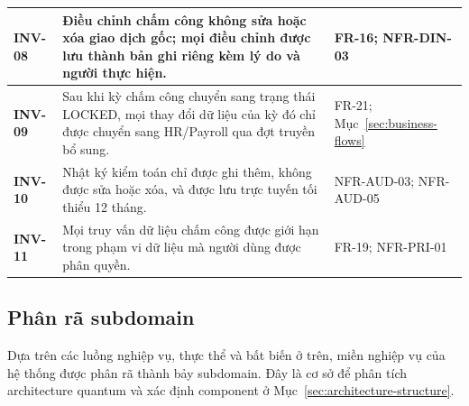 \begin{longtable}{|>{\centering\arraybackslash}m{1.4cm}|>{\raggedright\arraybackslash}m{10.4cm}|>{\raggedright\arraybackslash}m{3.6cm}|}
    \hline
    \textbf{INV-08} & Điều chỉnh chấm công không sửa hoặc xóa giao dịch gốc; mọi điều chỉnh được lưu thành bản ghi riêng kèm lý do và người thực hiện. & FR-16; NFR-DIN-03\\
    \hline
    \textbf{INV-09} & Sau khi kỳ chấm công chuyển sang trạng thái LOCKED, mọi thay đổi dữ liệu của kỳ đó chỉ được chuyển sang HR/Payroll qua đợt truyền bổ sung. & FR-21; Mục~\ref{sec:business-flows}\\
    \hline
    \textbf{INV-10} & Nhật ký kiểm toán chỉ được ghi thêm, không được sửa hoặc xóa, và được lưu trực tuyến tối thiểu 12 tháng. & NFR-AUD-03; NFR-AUD-05\\
    \hline
    \textbf{INV-11} & Mọi truy vấn dữ liệu chấm công được giới hạn trong phạm vi dữ liệu mà người dùng được phân quyền. & FR-19; NFR-PRI-01\\
    \hline
\end{longtable}
\endgroup

\subsection{Phân rã subdomain}\label{sec:subdomains}
Dựa trên các luồng nghiệp vụ, thực thể và bất biến ở trên, miền nghiệp vụ của hệ thống được phân rã thành bảy subdomain. Đây là cơ sở để phân tích architecture quantum và xác định component ở Mục~\ref{sec:architecture-structure}.

